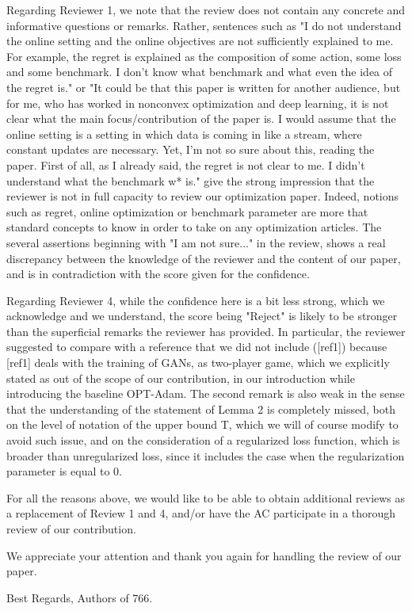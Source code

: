 \documentclass{article}
\begin{document}
Regarding Reviewer 1, we note that the review does not contain any concrete and informative questions or remarks. 
Rather, sentences such as "I do not understand the online setting and the online objectives are not sufficiently explained to me. For example, the regret is explained as the composition of some action, some loss and some benchmark. I don't know what benchmark and what even the idea of the regret is." or "It could be that this paper is written for another audience, but for me, who has worked in nonconvex optimization and deep learning, it is not clear what the main focus/contribution of the paper is. I would assume that the online setting is a setting in which data is coming in like a stream, where constant updates are necessary. Yet, I'm not so sure about this, reading the paper. First of all, as I already said, the regret is not clear to me. I didn't understand what the benchmark w* is." give the strong impression that the reviewer is not in full capacity to review our optimization paper. Indeed, notions such as regret, online optimization or benchmark parameter are more that standard concepts to know in order to take on any optimization articles.
The several assertions beginning with "I am not sure..." in the review, shows a real discrepancy between the knowledge of the reviewer and the content of our paper, and is in contradiction with the score given for the confidence.

Regarding Reviewer 4, while the confidence here is a bit less strong, which we acknowledge and we understand, the score being "Reject" is likely to be stronger than the superficial remarks the reviewer has provided. In particular, the reviewer suggested to compare with a reference that we did not include ([ref1]) because [ref1] deals with the training of GANs, as two-player game, which we explicitly stated as out of the scope of our contribution, in our introduction while introducing the baseline OPT-Adam. The second remark is also weak in the sense that the understanding of the statement of Lemma 2 is completely missed, both on the level of notation of the upper bound T, which we will of course modify to avoid such issue, and on the consideration of a regularized loss function, which is broader than unregularized loss, since it includes the case when the regularization parameter is equal to 0.

For all the reasons above, we would like to be able to obtain additional reviews as a replacement of Review 1 and 4, and/or have the AC participate in a thorough review of our contribution.

We appreciate your attention and thank you again for handling the review of our paper. 

Best Regards,
Authors of 766.
\end{document}
